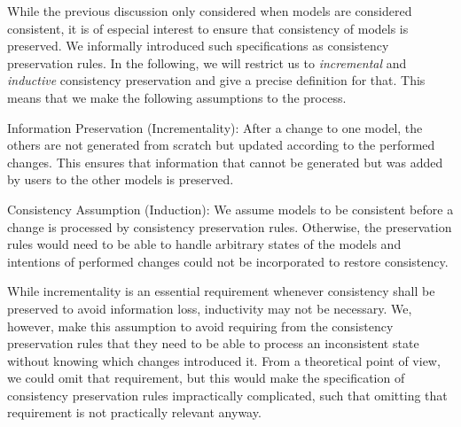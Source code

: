 While the previous discussion only considered when models are considered consistent, it is of especial interest to ensure that consistency of models is preserved.
We informally introduced such specifications as consistency preservation rules.
In the following, we will restrict us to \emph{incremental} and \emph{inductive} consistency preservation and give a precise definition for that.
This means that we make the following assumptions to the process.
\begin{properdescription}
    \item[Information Preservation (Incrementality):] After a change to one model, the others are not generated from scratch but updated according to the performed changes. This ensures that information that cannot be generated but was added by users to the other models is preserved.
    \item[Consistency Assumption (Induction):] We assume models to be consistent before a change is processed by consistency preservation rules. Otherwise, the preservation rules would need to be able to handle arbitrary states of the models and intentions of performed changes could not be incorporated to restore consistency.
\end{properdescription}
While incrementality is an essential requirement whenever consistency shall be preserved to avoid information loss, inductivity may not be necessary.
We, however, make this assumption to avoid requiring from the consistency preservation rules that they need to be able to process an inconsistent state without knowing which changes introduced it.
From a theoretical point of view, we could omit that requirement, but this would make the specification of consistency preservation rules impractically complicated, such that omitting that requirement is not practically relevant anyway.


